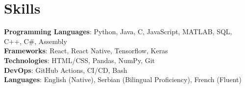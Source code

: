 \section{Skills}
    \begin{itemize}[leftmargin=0.15in, label={}]
	\small{\item{
		\textbf{Programming Languages}{: Python, Java, C, JavaScript, MATLAB, SQL, C++, C\#, Assembly} \\
		\textbf{Frameworks}{: React, React Native, Tensorflow, Keras} \\
		\textbf{Technologies}{: HTML/CSS, Pandas, NumPy, Git} \\
		\textbf{DevOps}{: GitHub Actions, CI/CD, Bash} \\
		\textbf{Languages}{: English (Native), Serbian (Bilingual Proficiency), French (Fluent)} \\

	}}
    \end{itemize}
